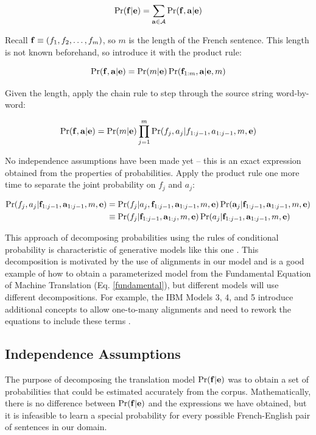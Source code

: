 \documentclass[11pt]{article}
\begin{document}
\begin{equation}
    \Pr(\mathbf{f} | \mathbf{e}) = \sum_{\mathbf{a} \in \mathcal{A}} \Pr(\mathbf{f}, \mathbf{a} | \mathbf{e})
\end{equation}

Recall $\mathbf{f} \equiv (f_1, f_2, \dotsc, f_m)$, so $m$ is the length of the French sentence.
This length is not known beforehand, so introduce it with the product rule:

\begin{equation}
    \Pr(\mathbf{f}, \mathbf{a} | \mathbf{e}) = \Pr(m | \mathbf{e}) \Pr(\mathbf{f}_{1:m}, \mathbf{a} | \mathbf{e}, m)
\end{equation}

Given the length, apply the chain rule to step through the source string word-by-word:

\begin{equation}
    \Pr(\mathbf{f}, \mathbf{a} | \mathbf{e})  = \Pr(m | \mathbf{e}) \prod_{j=1}^m \Pr(f_j, a_j | f_{1:j-1}, a_{1:j-1}, m, \mathbf{e})
\end{equation}

No independence assumptions have been made yet -- this is an
exact expression obtained from the properties of probabilities.
Apply the product rule one more time to separate the joint probability on $f_j$ and $a_j$:

\begin{align}
    \Pr(f_j, a_j | \mathbf{f}_{1:j-1}, \mathbf{a}_{1:j-1}, m, \mathbf{e}) &= \Pr(f_j | a_j, \mathbf{f}_{1:j-1}, \mathbf{a}_{1:j-1}, m, \mathbf{e}) \Pr(\mathbf{a}_j | \mathbf{f}_{1:j-1}, \mathbf{a}_{1:j-1}, m, \mathbf{e}) \\
        &\equiv\Pr(f_j | \mathbf{f}_{1:j-1}, \mathbf{a}_{1:j}, m, \mathbf{e}) \Pr(a_j | \mathbf{f}_{1:j-1}, \mathbf{a}_{1:j-1}, m, \mathbf{e})
\end{align}

This approach of decomposing probabilities using the rules of conditional probability 
is characteristic of generative models like this one \cite{lopez}.
This decomposition is motivated by the use of alignments in our model and is a good example of how to obtain a parameterized
model from the Fundamental Equation of Machine Translation (Eq. \ref{fundamental}), but different models will use different decompositions.
For example, the IBM Models 3, 4, and 5 introduce additional concepts to allow one-to-many alignments and need to rework the equations
to include these terms \cite{brown:93}.

\subsection{Independence Assumptions}

The purpose of decomposing the translation model $\Pr(\mathbf{f} | \mathbf{e})$ was to obtain a set of probabilities that could be estimated
accurately from the corpus. Mathematically, there is no difference between $\Pr(\mathbf{f} | \mathbf{e})$ and the expressions we have obtained,
but it is infeasible to learn a special probability for every possible French-English pair of sentences in our domain.
\end{document}
